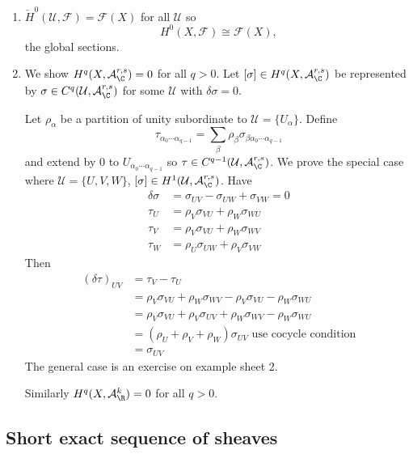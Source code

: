\documentclass[a4paper]{article}
\begin{document}
\begin{eg}\leavevmode
  \begin{enumerate}
  \item \(\check H^0(\mathcal U, \mathcal F) = \mathcal F(X)\) for all \(\mathcal U\) so
    \[
      H^0(X, \mathcal F) \cong \mathcal F(X),
    \]
    the global sections.
  \item We show \(H^q(X, \mathcal A_\C^{r, s}) = 0\) for all \(q > 0\). Let \([\sigma] \in H^q(X, \mathcal A_\C^{r, s})\) be represented by \(\sigma \in C^q(\mathcal U, \mathcal A_\C^{r, s})\) for some \(\mathcal U\) with \(\delta \sigma = 0\).

    Let \(\rho_\alpha\) be a partition of unity subordinate to \(\mathcal U = \{U_\alpha\}\). Define
    \[
      \tau_{\alpha_0 \cdots \alpha_{q - 1}} = \sum_\beta \rho_\beta \sigma_{\beta \alpha_0 \cdots \alpha_{q - 1}}
    \]
    and extend by \(0\) to \(U_{\alpha_0 \cdots \alpha_{q - 1}}\) so \(\tau \in C^{q - 1}(\mathcal U, \mathcal A_\C^{r, s})\). We prove the special case where \(\mathcal U = \{U, V, W\}\), \([\sigma] \in H^1(\mathcal U, \mathcal A_\C^{r, s})\). Have
    \begin{align*}
      \delta \sigma &= \sigma_{UV} - \sigma_{UW} + \sigma_{VW} = 0 \\
      \tau_U &= \rho_V \sigma_{VU} + \rho_W \sigma_{WU} \\
      \tau_V &= \rho_V \sigma_{VU} + \rho_W \sigma_{WV} \\
      \tau_W &= \rho_U \sigma_{UW} + \rho_V \sigma_{VW}
    \end{align*}
    Then
    \begin{align*}
      (\delta \tau)_{UV}
      &= \tau_V - \tau_U \\
      &= \rho_V \sigma_{VU} + \rho_W \sigma_{WV} - \rho_V \sigma_{VU} - \rho_W \sigma_{WU} \\
      &= \rho_V \sigma_{VU} + \rho_V \sigma_{UV} + \rho_W \sigma_{WV} - \rho_W \sigma_{WU} \\
      &= (\rho_U + \rho_V + \rho_W) \sigma_{UV} \text{ use cocycle condition} \\
      &= \sigma_{UV}
    \end{align*}
    The general case is an exercise on example sheet 2.

    Similarly \(H^q(X, \mathcal A_\R^k) = 0\) for all \(q > 0\).
  \end{enumerate}
\end{eg}

\subsection{Short exact sequence of sheaves}
\end{document}
